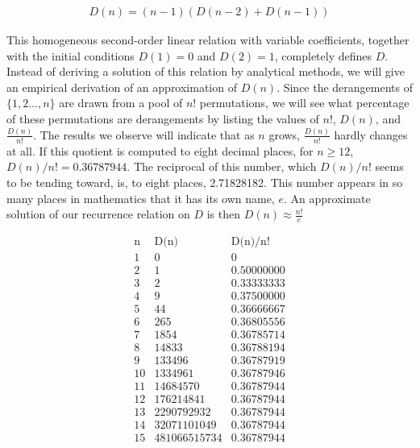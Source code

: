 \documentclass[10pt,]{book}
\theoremstyle{plain}
\theoremstyle{definition}
\theoremstyle{definition}
\theoremstyle{definition}
\theoremstyle{definition}
\numberwithin{equation}{section}
\begin{document}
\begin{gather}
D(n) = (n - 1) (D(n - 2) + D(n - 1))\label{mrow-12}
\end{gather}
%
\par
This homogeneous second-order linear relation with variable coefficients, together with the initial conditions \(D(1) = 0\) and \(D(2) = 1\), completely
defines \(D\). Instead of deriving a solution of this relation by analytical methods, we will give an empirical derivation of an approximation of \(D(n)\). Since the derangements of \(\{1,2 . . . , n\}\) are drawn from a pool of \(n!\) permutations, we will see what percentage of these permutations
are derangements by listing the values of \(n!\), \(D(n)\), { }and \(\frac{D(n)}{n!}\).  The results we observe will indicate that
as \(n\) grows, \(\frac{D(n)}{n!}\) hardly changes at all. If this quotient is computed to eight decimal places, for \(n \geq  12\), \(D(n)/n!
= 0.36787944\). The reciprocal of this number, which \(D(n)/n!\) seems to be tending toward, is, to eight places, 2.71828182. This number appears
in so many places in mathematics that it has its own name, \(e\). An approximate solution of our recurrence relation on \(D\) is then \(D(n)\approx \frac{n!}{e}\)%
\par

\begin{equation*}\begin{array}{lll}
 \text{n} & \text{D(n)} & \text{D(n)/n!} \\
 1 & 0 & 0 \\
 2 & 1 & 0.50000000 \\
 3 & 2 & 0.33333333 \\
 4 & 9 & 0.37500000 \\
 5 & 44 & 0.36666667 \\
 6 & 265 & 0.36805556 \\
 7 & 1854 & 0.36785714 \\
 8 & 14833 & 0.36788194 \\
 9 & 133496 & 0.36787919 \\
 10 & 1334961 & 0.36787946 \\
 11 & 14684570 & 0.36787944 \\
 12 & 176214841 & 0.36787944 \\
 13 & 2290792932 & 0.36787944 \\
 14 & 32071101049 & 0.36787944 \\
 15 & 481066515734 & 0.36787944 \\
\end{array}
\end{equation*}
%
\typeout{************************************************}
\typeout{************************************************}
\end{document}
